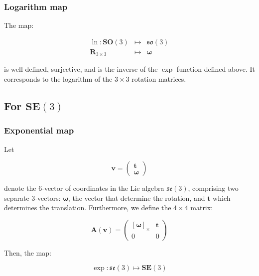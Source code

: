 \documentclass[a4paper,11pt]{report}
\newcommand{\W}{{\bm{\omega}}}
\begin{document}
\subsubsection{Logarithm map}

The map:

\begin{eqnarray}
  \ln: \mathbf{SO}(3) & \mapsto & \mathfrak{so}(3)   \\
           \mathbf{R}_{3\times 3} & \mapsto &  \W
\end{eqnarray}

\noindent is well-defined, surjective, and is the inverse of the $\exp$ function defined above. 
It corresponds to the logarithm of the $3\times 3$ rotation matrices.



\subsection{For $\mathbf{SE}(3)$}

\subsubsection{Exponential map}
\label{sect:se3_exp}

Let 

\begin{equation}
\label{eq:vector_in_se3}
\mathbf{v}= \left( \begin{array}{c} \mathbf{t} \\ \W \end{array} \right)
\end{equation}

\noindent denote the 6-vector of coordinates in 
the Lie algebra $\mathfrak{se}(3)$, 
comprising
two separate 3-vectors: $\W$, the vector that determine 
the rotation, and $\mathbf{t}$ which determines the translation.
Furthermore, we define the $4 \times 4$ matrix:

\begin{equation}
 \mathbf{A}(\mathbf{v})=
\left( 
\begin{array}{cc}
 [\W]_\times  & \mathbf{t} \\
 0 & 0
\end{array}
\right)
\end{equation}


Then, the map:

\begin{equation}
  \exp: \mathfrak{se}(3) \mapsto \mathbf{SE}(3)
\end{equation}
\end{document}
